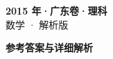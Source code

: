 \documentclass[zihao=-4, a4paper]{ctexart}
\begin{document}
\begin{center}
  {\Large\bfseries 2015 年·广东卷·理科}\\[4pt]
  {\large 数学 · 解析版}
\end{center}
\medskip
{}

\clearpage
{}
\begin{center}{\Large\bfseries 参考答案与详细解析}\end{center}
\medskip

\end{document}
